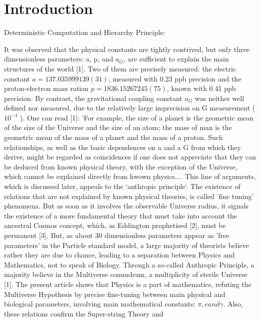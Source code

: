 
\chapter{Introduction}

Deterministic Computation and Hierarchy Principle:
\begin{center}
It was observed that the physical constants are tightly contrived, but only three dimensionless
parameters: a, p, and $a_{G}$, are sufficient to explain the main structures of the world [1]. Two of them
are precisely measured: the electric constant $a = 137.035999139(31)$, measured with 0.23 ppb
precision and the proton-electron mass ration $p = 1836.15267245(75)$, known with 0.41 ppb
precision. By contrast, the gravitational coupling constant $a_{G}$ was neither well defined nor
measured, due to the relatively large imprecision on G measurement ($10^{-4}$ ).
One can read [1]: 'For example, the size of a planet is the geometric mean of the size of the
Universe and the size of an atom; the mass of man is the geometric mean of the mass of a planet
and the mass of a proton. Such relationships, as well as the basic dependences on a and a G from
which they derive, might be regarded as coincidences if one does not appreciate that they can be
deduced from known physical theory, with the exception of the Universe, which cannot be explained
directly from kwown physics.... This line of arguments, which is discussed later, appeals to the
`anthropic principle`.
The existence of relations that are not explained by known physical theories, is called 'fine
tuning' phenomena. But as soon as it involves the observable Universe radius, it signals the
existence of a more fundamental theory that must take into account the ancestral Cosmos concept,
which, as Eddington prophetised [2], must be permanent [3].
But, as about 30 dimensionless parameters appear as 'free parameters' in the Particle standard
model, a large majority of theorists believe rather they are due to chance, leading to a separation
between Physics and Mathematics, not to speak of Biology. Through a so-called Anthropic
Principle, a majority believe in the Multiverse conundrum, a multiplicity of sterile Universe [1].
The present article shows that Physics is a part of mathematics, refuting the Multiverse
Hypothesis by precise fine-tuning between main physical and biological parameters, involving
main mathematical constants: $\pi, e and \gamma $. Also, these relations confirm the Super-string Theory and

\end{center}

